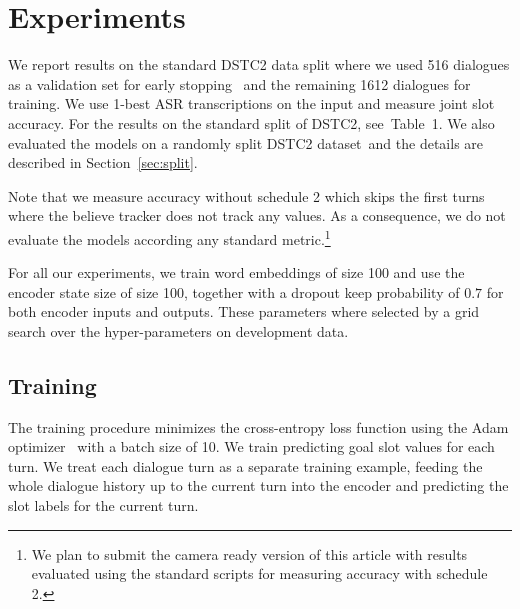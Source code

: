 \documentclass{itatnew}
\begin{document}
\section{Experiments}
\label{sec:exp}
We report results on the standard DSTC2 data split where we used 516 dialogues as a validation set for early stopping~\cite{prechelt1998early} and the remaining 1612 dialogues for training.
We use 1-best ASR transcriptions on the input and measure joint slot accuracy.
For the results on the standard split of DSTC2, see~Table~1.
We also evaluated the models on a randomly split DSTC2 dataset\, and the details are described in Section~\ref{sec:split}.


Note that we measure accuracy without schedule 2 which skips the first turns where the believe tracker does not track any values. As a consequence, we do not evaluate the models according any  standard metric.\footnote{We plan to submit the camera ready version of this article with results evaluated using the standard scripts for measuring accuracy with schedule 2.}


For all our experiments, we train word embeddings of size 100 and use the encoder state size of size 100, together with a dropout keep probability of $0.7$ for both encoder inputs and outputs.
These parameters where selected by a grid search over the hyper-parameters on development data.

\subsection{Training}
\label{sec:train}
The training procedure minimizes the cross-entropy loss function using the Adam optimizer~\cite{kingma2014adam} with a batch size of 10.
We train predicting goal slot values for each turn.
We treat each dialogue turn as a separate training example, feeding the whole dialogue history up to the current turn into the encoder and predicting the slot labels for the current turn.
\end{document}
